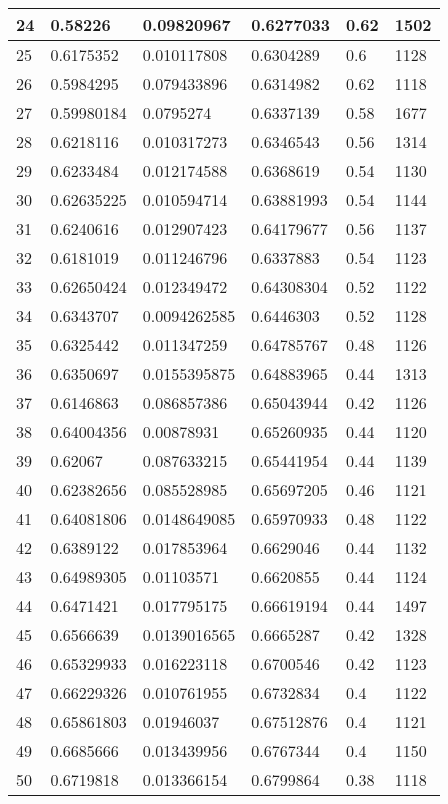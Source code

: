 \begin{longtable}{|l|l|l|l|l|l|}
24 & 0.58226 & 0.09820967 & 0.6277033 & 0.62 & 1502 \\ \hline 
25 & 0.6175352 & 0.010117808 & 0.6304289 & 0.6 & 1128 \\ \hline 
26 & 0.5984295 & 0.079433896 & 0.6314982 & 0.62 & 1118 \\ \hline 
27 & 0.59980184 & 0.0795274 & 0.6337139 & 0.58 & 1677 \\ \hline 
28 & 0.6218116 & 0.010317273 & 0.6346543 & 0.56 & 1314 \\ \hline 
29 & 0.6233484 & 0.012174588 & 0.6368619 & 0.54 & 1130 \\ \hline 
30 & 0.62635225 & 0.010594714 & 0.63881993 & 0.54 & 1144 \\ \hline 
31 & 0.6240616 & 0.012907423 & 0.64179677 & 0.56 & 1137 \\ \hline 
32 & 0.6181019 & 0.011246796 & 0.6337883 & 0.54 & 1123 \\ \hline 
33 & 0.62650424 & 0.012349472 & 0.64308304 & 0.52 & 1122 \\ \hline 
34 & 0.6343707 & 0.0094262585 & 0.6446303 & 0.52 & 1128 \\ \hline 
35 & 0.6325442 & 0.011347259 & 0.64785767 & 0.48 & 1126 \\ \hline 
36 & 0.6350697 & 0.0155395875 & 0.64883965 & 0.44 & 1313 \\ \hline 
37 & 0.6146863 & 0.086857386 & 0.65043944 & 0.42 & 1126 \\ \hline 
38 & 0.64004356 & 0.00878931 & 0.65260935 & 0.44 & 1120 \\ \hline 
39 & 0.62067 & 0.087633215 & 0.65441954 & 0.44 & 1139 \\ \hline 
40 & 0.62382656 & 0.085528985 & 0.65697205 & 0.46 & 1121 \\ \hline 
41 & 0.64081806 & 0.0148649085 & 0.65970933 & 0.48 & 1122 \\ \hline 
42 & 0.6389122 & 0.017853964 & 0.6629046 & 0.44 & 1132 \\ \hline 
43 & 0.64989305 & 0.01103571 & 0.6620855 & 0.44 & 1124 \\ \hline 
44 & 0.6471421 & 0.017795175 & 0.66619194 & 0.44 & 1497 \\ \hline 
45 & 0.6566639 & 0.0139016565 & 0.6665287 & 0.42 & 1328 \\ \hline 
46 & 0.65329933 & 0.016223118 & 0.6700546 & 0.42 & 1123 \\ \hline 
47 & 0.66229326 & 0.010761955 & 0.6732834 & 0.4 & 1122 \\ \hline 
48 & 0.65861803 & 0.01946037 & 0.67512876 & 0.4 & 1121 \\ \hline 
49 & 0.6685666 & 0.013439956 & 0.6767344 & 0.4 & 1150 \\ \hline 
50 & 0.6719818 & 0.013366154 & 0.6799864 & 0.38 & 1118 \\ \hline 
\end{longtable}